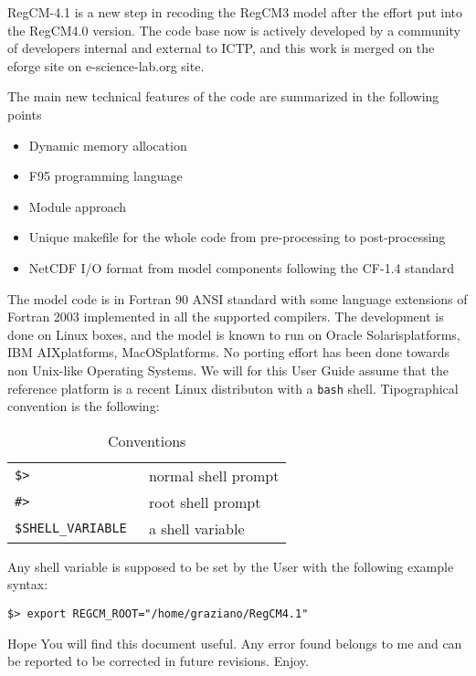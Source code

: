 %
%

RegCM-4.1 is a new step in recoding the RegCM3 model after the effort put into
the RegCM4.0 version. The code base now is actively developed by a community
of developers internal and external to ICTP, and this work is merged on the
eforge site on e-science-lab.org site.

The main new technical features of the code are summarized in the following
points

\begin{itemize}
\item Dynamic memory allocation
\item F95 programming language
\item Module approach
\item Unique makefile for the whole code from pre-processing to post-processing
\item NetCDF I/O format from model components following the CF-1.4 standard
\end{itemize}

The model code is in Fortran 90 ANSI standard with some language extensions of
Fortran 2003 implemented in all the supported compilers.
The development is done on Linux boxes, and the model is known to run
on Oracle Solaris\texttrademark platforms, IBM AIX\texttrademark platforms,
MacOS\texttrademark platforms.
No porting effort has been done towards non Unix-like Operating Systems.
We will for this User Guide assume that the reference platform is a recent
Linux distributon with a \verb=bash= shell.
Tipographical convention is the following:

\begin{table}[ht]
\caption{Conventions}
\vspace{0.05 in}
\centering
\begin{tabular}{l|l}
\hline
\verb=$> = & normal shell prompt \\
\verb=#> = & root shell prompt \\
\verb=$SHELL_VARIABLE = & a shell variable \\
\hline
\end{tabular}
\label{conventions}
\end{table}

Any shell variable is supposed to be set by the User with the following example
syntax:

\begin{Verbatim}
$> export REGCM_ROOT="/home/graziano/RegCM4.1"
\end{Verbatim}

Hope You will find this document useful. Any error found belongs to me and can
be reported to be corrected in future revisions. Enjoy.
